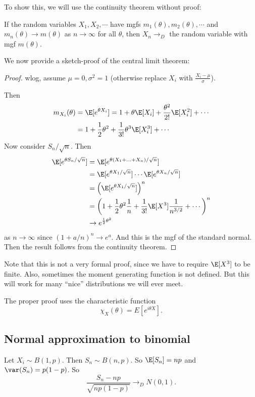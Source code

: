 \documentclass[a4paper]{article}
\begin{document}
To show this, we will use the continuity theorem without proof:
\begin{thm}
  If the random variables $X_1, X_2, \cdots$ have mgfs $m_1(\theta), m_2(\theta), \cdots$ and $m_n(\theta) \to m(\theta)$ as $n\to\infty$ for all $\theta$, then $X_n \to_D $ the random variable with mgf $m(\theta)$.
\end{thm}

We now provide a sketch-proof of the central limit theorem:
\begin{proof}
  wlog, assume $\mu = 0, \sigma^2 = 1$ (otherwise replace $X_i$ with $\frac{X_i - \mu}{\sigma}$).

  Then
  \begin{align*}
    m_{X_i}(\theta) &= \E[e^{\theta X_i}] = 1 + \theta \E[X_i] + \frac{\theta^2}{2!} \E[X_i^2] + \cdots\\
    &=1 + \frac{1}{2}\theta^2 + \frac{1}{3!}\theta^3 \E[X_i^3] + \cdots
  \end{align*}
  Now consider $S_n/\sqrt{n}$. Then
  \begin{align*}
    \E[e^{\theta S_n/\sqrt{n}}] &= \E[e^{\theta(X_1 + \ldots + X_n)/\sqrt{n}}]\\
    &= \E[e^{\theta X_1/\sqrt{n}}] \cdots \E[e^{\theta X_n/\sqrt{n}}]\\
    &= \left(\E[e^{\theta X_1/\sqrt{n}}]\right)^n\\
    &= \left(1 + \frac{1}{2}\theta^2 \frac{1}{n} + \frac{1}{3!}\E[X^3]\frac{1}{n^{3/2}} + \cdots\right)^{n}\\
    &\to e^{\frac{1}{2}\theta^2}
  \end{align*}
  as $n \to \infty$ since $(1 + a/n)^n \to e^a$. And this is the mgf of the standard normal. Then the result follows from the continuity theorem.
\end{proof}
Note that this is not a very formal proof, since we have to require $\E[X^3]$ to be finite. Also, sometimes the moment generating function is not defined. But this will work for many ``nice'' distributions we will ever meet.

The proper proof uses the characteristic function
\[
  \chi_X(\theta) = E[e^{i\theta X}].
\]
\subsection{Normal approximation to binomial}
Let $X_i \sim B(1, p)$. Then $S_n \sim B(n, p)$. So $\E[S_n] = np$ and $\var (S_n) = p(1 - p)$. So
\[
  \frac{S_n - np}{\sqrt{np(1 - p)}} \to_D N(0, 1).
\]
\end{document}

